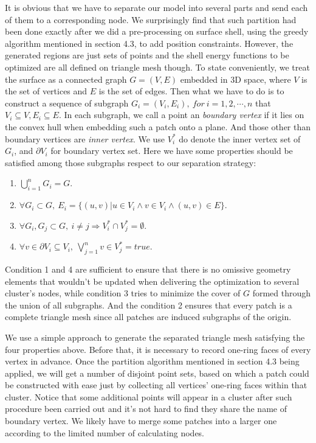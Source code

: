 \documentclass[a4paper,9pt,twocolumn]{extarticle}
\begin{document}
It is obvious that we have to separate our model into several parts and send each of them to a corresponding node. We surprisingly find that such partition had been done exactly after we did a pre-processing on surface shell, using the greedy algorithm mentioned in section 4.3, to add position constraints. However, the generated regions are just sets of points and the shell energy functions to be optimized are all defined on triangle mesh though. To state conveniently, we treat the surface as a connected graph $G=(V,E)$ embedded in 3D space, where $V$ is the set of vertices and $E$ is the set of edges. Then what we have to do is to construct a sequence of subgraph $G_i=(V_i,E_i), ~for~i=1,2,\cdots,n$ that $V_i\subseteq V, E_i\subseteq E$. In each subgraph, we call a point an \textit{boundary vertex} if it lies on the convex hull when embedding such a patch onto a plane. And those other than boundary vertices are \textit{inner vertex}. We use $V_i^*$ do denote the inner vertex set of $G_i$, and $\partial{V}_i$ for boundary vertex set. Here we have some properties should be satisfied among those subgraphs respect to our separation strategy:
\begin{enumerate}
  \item $\displaystyle{\bigcup_{i=1}^n}G_i = G$.
  \item $\forall G_i \subset G, ~E_i=\{ (u,v)|u\in V_i\land v\in V_i \land (u,v)\in E\}$.
  \item $\forall G_i, G_j \subset G, ~ i \neq j \Rightarrow V_i^* \cap V_j^* = \emptyset$.
  \item $\forall v \in \partial{V}_i \subseteq V_i, ~ \displaystyle{\bigvee_{j=1}^n} v \in V_j^* = true$.
\end{enumerate}
Condition 1 and 4 are sufficient to ensure that there is no omissive geometry elements that wouldn't be updated when delivering the optimization to several cluster's nodes, while condition 3 tries to minimize the cover of $G$ formed through the union of all subgraphs. And the condition 2 ensures that every patch is a complete triangle mesh since all patches are induced subgraphs of the origin.

We use a simple approach to generate the separated triangle mesh satisfying the four properties above. Before that, it is necessary to record one-ring faces of every vertex in advance. Once the partition algorithm mentioned in section 4.3 being applied, we will get a number of disjoint point sets, based on which a patch could be constructed with ease just by collecting all vertices' one-ring faces within that cluster. Notice that some additional points will appear in a cluster after such procedure been carried out and it's not hard to find they share the name of boundary vertex. We likely have to merge some patches into a larger one according to the limited number of calculating nodes.
\end{document}
